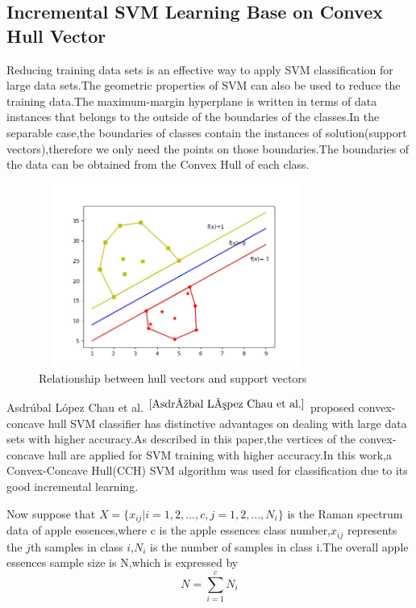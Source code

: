 \documentclass[a4paper]{article}
\begin{document}
\subsection{Incremental SVM Learning Base on Convex Hull Vector}
Reducing training data sets is an effective way to apply SVM classification for large data sets.The geometric properties of SVM can also be used to reduce the training data.The maximum-margin hyperplane is written in terms of data instances that belongs to the outside of the boundaries of the classes.In the separable case,the boundaries of classes contain the instances of solution(support vectors),therefore we only need the points on those boundaries.The boundaries of the data can be obtained from the Convex Hull of each class.




\begin{figure}[h]
  \centering
  \includegraphics[width=9cm,height=6cm]{HullVector_SupportVector}
  \caption{Relationship between hull vectors and support vectors}
\end{figure}
Asdrúbal López Chau et al. $ ^{\cite{Asdrúbal López Chau et al.}}$ proposed convex-concave hull SVM classiﬁer has distinctive advantages on dealing with large data sets with higher accuracy.As described in this paper,the vertices of the convex-concave hull are applied for SVM training with higher accuracy.In this work,a Convex-Concave Hull(CCH) SVM algorithm was used for classification due to its good incremental learning.

Now suppose that $X =\{x_{ij} | i = 1,2,...,c,j=1,2,...,N_i\}$ is the Raman spectrum data of  apple essences,where c is the apple essences class number,$x_{ij}$ represents the $j$th samples in class $i$,$N_i$ is the number of samples in class i.The overall apple essences sample size is N,which is expressed by
$$N = \sum _{i=1} ^{c} N_i$$
\end{document}

